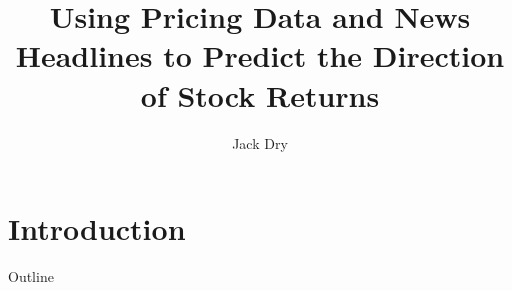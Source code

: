 \documentclass[t]{beamer}
\title{Using Pricing Data and News Headlines to Predict the Direction of Stock Returns}
\author{Jack Dry}
\date{}
\begin{document}
\begin{frame}[plain]
\titlepage
\end{frame}

\section{Introduction}
\begin{frame}{Outline}
\tableofcontents[currentsection]
\end{frame}
\end{document}

